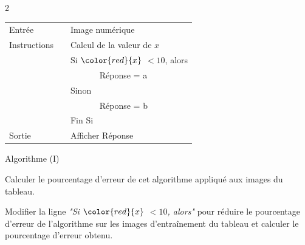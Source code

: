 \begin{MADenumerate}
\begin{multicols}{2}
\begin{center}
				\begin{tabular}{|lcll|}
					\hline
					Entrée       &  & \multicolumn{2}{l|}{Image numérique}                                \\

					Instructions &  & \multicolumn{2}{l|}{Calcul de la valeur de $x$}                     \\
					             &  & \multicolumn{2}{l|}{Si $\color{red}{x}$ $<10$, alors}               \\
					             &  & \multicolumn{1}{l}{$\quad$}                           & Réponse = a \\
					             &  & \multicolumn{2}{l|}{Sinon}                                          \\
					             &  & \multicolumn{1}{l}{$\quad$}                           & Réponse = b \\
					             &  & \multicolumn{2}{l|}{Fin Si}                                         \\
					Sortie       &  & \multicolumn{2}{l|}{Afficher Réponse}                               \\\hline\end{tabular}

				Algorithme (I)\\ \end{center}

		\end{multicols}

		\item Calculer le pourcentage d'erreur de cet algorithme appliqué aux images du tableau.
		\item Modifier la ligne \textit{"Si $\color{red}{x} $ $<10$, alors"} pour réduire le pourcentage d'erreur de l'algorithme sur les images d'entraînement du tableau et calculer le pourcentage d'erreur obtenu.
	\end{MADenumerate}
